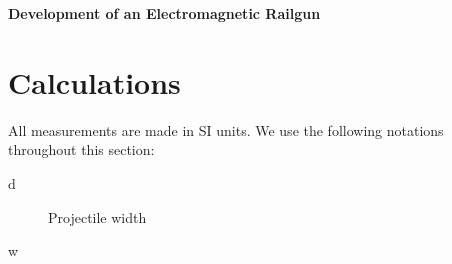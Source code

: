\documentclass[12pt]{article}
\begin{document}
\begin{center}
    \textbf{\LARGE{Development of an Electromagnetic Railgun}} \\
\end{center}


\section{Calculations}
All measurements are made in SI units. We use the following notations throughout this section: 
\begin{description}
    \item[d] Projectile width
    \item[w]  
\end{description}
\end{document}
